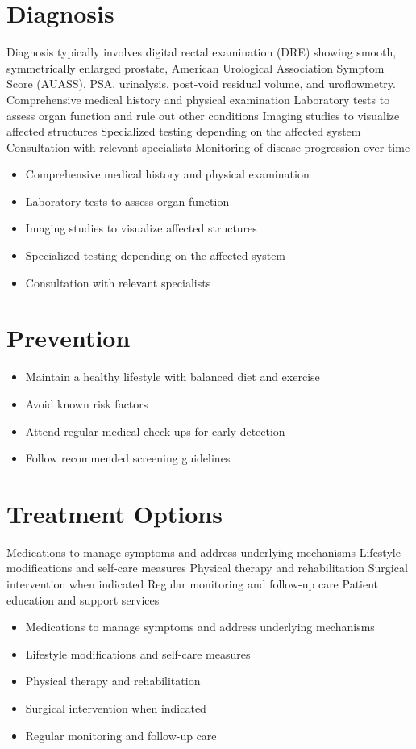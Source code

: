 \section{Diagnosis}
Diagnosis typically involves digital rectal examination (DRE) showing smooth, symmetrically enlarged prostate, American Urological Association Symptom Score (AUASS), PSA, urinalysis, post-void residual volume, and uroflowmetry. Comprehensive medical history and physical examination Laboratory tests to assess organ function and rule out other conditions Imaging studies to visualize affected structures Specialized testing depending on the affected system Consultation with relevant specialists Monitoring of disease progression over time

\begin{itemize}[noitemsep]
  \item Comprehensive medical history and physical examination
  \item Laboratory tests to assess organ function
  \item Imaging studies to visualize affected structures
  \item Specialized testing depending on the affected system
  \item Consultation with relevant specialists
\end{itemize}
\section{Prevention}
\begin{itemize}[noitemsep]
  \item Maintain a healthy lifestyle with balanced diet and exercise
  \item Avoid known risk factors
  \item Attend regular medical check-ups for early detection
  \item Follow recommended screening guidelines
\end{itemize}
\section{Treatment Options}
Medications to manage symptoms and address underlying mechanisms Lifestyle modifications and self-care measures Physical therapy and rehabilitation Surgical intervention when indicated Regular monitoring and follow-up care Patient education and support services

\begin{itemize}[noitemsep]
  \item Medications to manage symptoms and address underlying mechanisms
  \item Lifestyle modifications and self-care measures
  \item Physical therapy and rehabilitation
  \item Surgical intervention when indicated
  \item Regular monitoring and follow-up care
\end{itemize}
